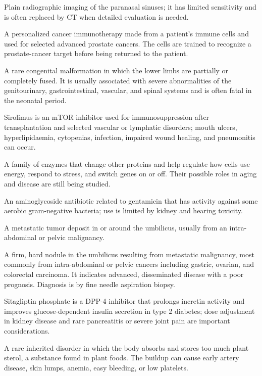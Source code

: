  Plain radiographic imaging of the paranasal sinuses; it has limited sensitivity and is often replaced by CT when detailed evaluation is needed.

 A personalized cancer immunotherapy made from a patient’s immune cells and used for selected advanced prostate cancers. The cells are trained to recognize a prostate-cancer target before being returned to the patient.

 A rare congenital malformation in which the lower limbs are partially or completely
fused. It is usually associated with severe abnormalities of the genitourinary,
gastrointestinal, vascular, and spinal systems and is often fatal in the neonatal
period.

 Sirolimus is an mTOR inhibitor used for immunosuppression after transplantation and selected vascular or lymphatic disorders; mouth ulcers, hyperlipidaemia, cytopenias, infection, impaired wound healing, and pneumonitis can occur.

 A family of enzymes that change other proteins and help regulate how cells use energy, respond to stress, and switch genes on or off. Their possible roles in aging and disease are still being studied.

 An aminoglycoside antibiotic related to gentamicin that has activity against some aerobic gram-negative bacteria; use is limited by kidney and hearing toxicity.

 A metastatic tumor deposit in or around the umbilicus, usually from an intra-abdominal or pelvic malignancy.

 A firm, hard nodule in the umbilicus resulting from metastatic malignancy, most commonly
from intra-abdominal or pelvic cancers including gastric, ovarian, and colorectal
carcinoma. It indicates advanced, disseminated disease with a poor prognosis. Diagnosis
is by fine needle aspiration biopsy.

 Sitagliptin phosphate is a DPP-4 inhibitor that prolongs incretin activity and improves glucose-dependent insulin secretion in type 2 diabetes; dose adjustment in kidney disease and rare pancreatitis or severe joint pain are important considerations.

 A rare inherited disorder in which the body absorbs and stores too much plant sterol, a substance found in plant foods. The buildup can cause early artery disease, skin lumps, anemia, easy bleeding, or low platelets.

